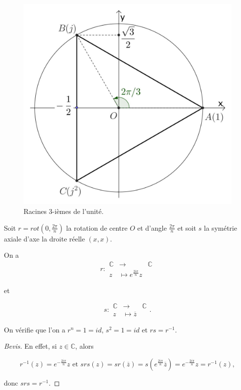 \documentclass[french]{book}
\theoremstyle{definition}
\begin{document}
\begin{figure}[h!]
  \centering
  \includegraphics[scale=0.3]{figures/racines-3.jpg}
  \caption{Racines 3-ièmes de l'unité.}
  \label{}
\end{figure}

Soit $r = rot(0, \frac{2 \pi}{n})$ la rotation de centre $O$ et d'angle $\frac{2 \pi}{n}$ et soit $s$ la symétrie axiale d'axe la droite réelle $(x,x)$.

On a \[
r:\begin{array}{rcl}
\mathbb{C} & \longrightarrow & \mathbb{C} \\
z & \longmapsto e^{\frac{2 i \pi}{n}} z
\end{array}
\]

et

\[
s:
  \begin{array}{rcl}
  \mathbb{C} & \longrightarrow & \mathbb{C} \\
  z & \longmapsto \overline{z}
  \end{array}.
\]


On vérifie que l'on a $r ^{n} = 1 = id$, $s ^2 = 1 =id$ et $rs = r ^{-1} $.

\begin{proof}[Bevis]
  En effet, si $z \in \mathbb{C}$, alors

  \[
  r ^{-1} (z) = e^{- \frac{2 i \pi}{n}} z \text{ et } s r s(z) = s r (\overline{z} ) = s \left( e^{\frac{2 i \pi}{n}} \overline{z} \right) = e^{- \frac{2 i \pi}{n}} z = r ^{-1} (z),
  \]

  donc $s r s = r ^{-1} $.
\end{proof}
\end{document}
